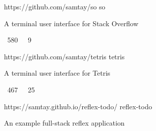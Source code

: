 \vspace{0.25em}
\begin{cvprojects}
  \cvproject
    {https://github.com/samtay/so}
    {so}
    {\begin{cvitems}
        \item A terminal user interface for Stack Overflow
        \item {\color{graytext} \faStarO \, 580 $\;$ \faCodeFork \, 9}
     \end{cvitems}}
  \cvproject
    {https://github.com/samtay/tetris}
    {tetris}
    {\begin{cvitems}
        \item A terminal user interface for Tetris
        \item {\color{graytext} \faStarO \, 467 $\;$ \faCodeFork \, 25}
     \end{cvitems}}
  \cvproject
    {https://samtay.github.io/reflex-todo/}
    {reflex-todo}
    {\begin{cvitems}
        \item An example full-stack reflex application
     \end{cvitems}}
\end{cvprojects}
